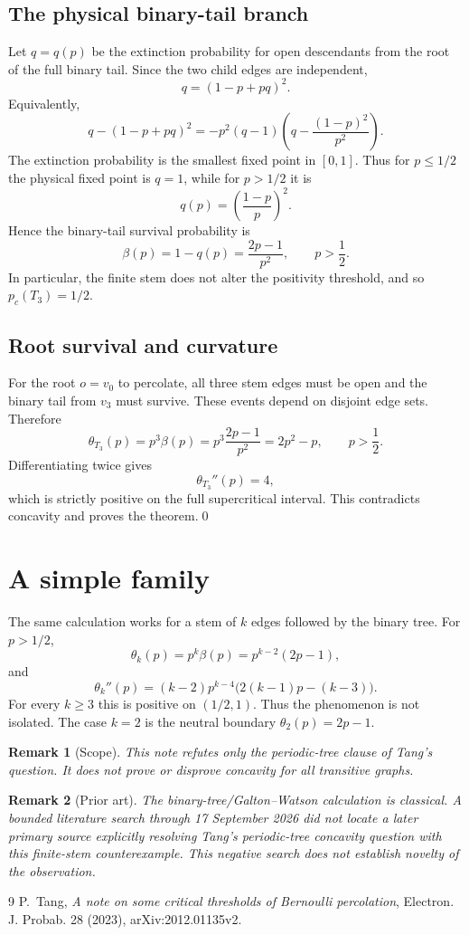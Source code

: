 \documentclass[11pt]{article}
\newtheorem{remark}{Remark}
\begin{document}
\subsection{The physical binary-tail branch}
Let $q=q(p)$ be the extinction probability for open descendants from the root of the full binary tail. Since the two child edges are independent,
\[
q=(1-p+pq)^2.
\]
Equivalently,
\[
q-(1-p+pq)^2
=-p^2(q-1)\left(q-\frac{(1-p)^2}{p^2}\right).
\]
The extinction probability is the smallest fixed point in $[0,1]$. Thus for $p\le1/2$ the physical fixed point is $q=1$, while for $p>1/2$ it is
\[
q(p)=\left(\frac{1-p}{p}\right)^2.
\]
Hence the binary-tail survival probability is
\[
\beta(p)=1-q(p)=\frac{2p-1}{p^2},
\qquad p>\frac12.
\]
In particular, the finite stem does not alter the positivity threshold, and so $p_c(T_3)=1/2$.

\subsection{Root survival and curvature}
For the root $o=v_0$ to percolate, all three stem edges must be open and the binary tail from $v_3$ must survive. These events depend on disjoint edge sets. Therefore
\[
\theta_{T_3}(p)=p^3\beta(p)
=p^3\frac{2p-1}{p^2}
=2p^2-p,
\qquad p>\frac12.
\]
Differentiating twice gives
\[
\theta_{T_3}''(p)=4,
\]
which is strictly positive on the full supercritical interval. This contradicts concavity and proves the theorem.\qed

\section{A simple family}
The same calculation works for a stem of $k$ edges followed by the binary tree. For $p>1/2$,
\[
\theta_k(p)=p^k\beta(p)=p^{k-2}(2p-1),
\]
and
\[
\theta_k''(p)
=(k-2)p^{k-4}\bigl(2(k-1)p-(k-3)\bigr).
\]
For every $k\ge3$ this is positive on $(1/2,1)$. Thus the phenomenon is not isolated. The case $k=2$ is the neutral boundary $\theta_2(p)=2p-1$.

\begin{remark}[Scope]
This note refutes only the periodic-tree clause of Tang's question. It does not prove or disprove concavity for all transitive graphs.
\end{remark}

\begin{remark}[Prior art]
The binary-tree/Galton--Watson calculation is classical. A bounded literature search through 17 September 2026 did not locate a later primary source explicitly resolving Tang's periodic-tree concavity question with this finite-stem counterexample. This negative search does not establish novelty of the observation.
\end{remark}

\begin{thebibliography}{9}
P.~Tang,
\emph{A note on some critical thresholds of Bernoulli percolation},
Electron. J. Probab. 28 (2023), arXiv:2012.01135v2.
\end{thebibliography}
\end{document}
